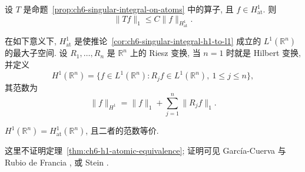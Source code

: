 \begin{Corollary}
\label{cor:ch6-singular-integral-h1-to-l1}
设 $T$ 是命题~\ref{prop:ch6-singular-integral-on-atoms} 中的算子, 且 $f\in H^1_{\mathrm{at}}$. 则
\[
 \|Tf\|_1\le C\|f\|_{H^1_{\mathrm{at}}}.
\]
\end{Corollary}

在如下意义下, $H^1_{\mathrm{at}}$ 是使推论~\ref{cor:ch6-singular-integral-h1-to-l1} 成立的 $L^1(\mathbb R^n)$ 的最大子空间. 设 $R_1,\ldots,R_n$ 是 $\mathbb R^n$ 上的 Riesz 变换, 当 $n=1$ 时就是 Hilbert 变换, 并定义
\[
 H^1(\mathbb R^n)
 =\{f\in L^1(\mathbb R^n):R_jf\in L^1(\mathbb R^n),\ 1\le j\le n\},
\]
其范数为
\[
 \|f\|_{H^1}=\|f\|_1+\sum_{j=1}^n\|R_jf\|_1.
\]

\begin{Theorem}
\label{thm:ch6-h1-atomic-equivalence}
$H^1(\mathbb R^n)=H^1_{\mathrm{at}}(\mathbb R^n)$, 且二者的范数等价.
\end{Theorem}

这里不证明定理~\ref{thm:ch6-h1-atomic-equivalence}; 证明可见 García-Cuerva 与 Rubio de Francia , 或 Stein .
